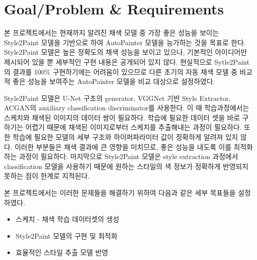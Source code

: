 \section{Goal/Problem \& Requirements}

본 프로젝트에서는 현재까지 알려진 채색 모델 중 가장 좋은 성능을 보이는 Style2Paint 모델을 기반으로 하여 AutoPainter 모델을 능가하는 것을 목표로 한다.
Style2Paint 모델은 높은 정확도의 채색 성능을 보이고 있으나, 기본적인 아이디어만 제시되어 있을 뿐 세부적인 구현 내용은 공개되어 있지 않다.
현실적으로 Sytle2Paint의 결과를 100\% 구현하기에는 어려움이 있으므로 다른 초기의 자동 채색 모델 중 비교적 좋은 성능을 보여주는 AutoPainter 모델을 비교 대상으로 설정하였다.

Style2Paint 모델은 U-Net 구조의 generator, VGGNet 기반 Style Extractor, ACGAN의 auxiliary classification discriminator를 사용한다.
이 때 학습과정에서는 스케치와 채색된 이미지의 데이터 쌍이 필요하다.
학습에 필요한 데이터 셋을 바로 구하기는 어렵기 때문에 채색된 이미지로부터 스케치를 추출해내는 과정이 필요하다.
또한 학습에 필요한 모델의 세부 구조와 하이퍼파라미터 값이 정확하게 알려져 있지 않다.
이러한 부분들은 채색 결과에 큰 영향을 미치므로, 좋은 성능을 내도록 이를 최적화하는 과정이 필요하다.
마지막으로 Style2Paint 모델은 style extraction 과정에서 classification 모델을 사용하기 때문에 원하는 스타일의 색 정보가 정확하게 반영되지 못하는 점이 한계로 지적된다.

본 프로젝트에서는 이러한 문제들을 해결하기 위하여 다음과 같은 세부 목표들을 설정하였다.
\begin{itemize}[topsep=0pt,itemsep=-1ex,partopsep=1ex,parsep=1ex]
	\item 스케치 - 채색 학습 데이터셋의 생성
	\item Style2Paint 모델의 구현 및 최적화
	\item 효율적인 스타일 추출 모델 반영
\end{itemize}
